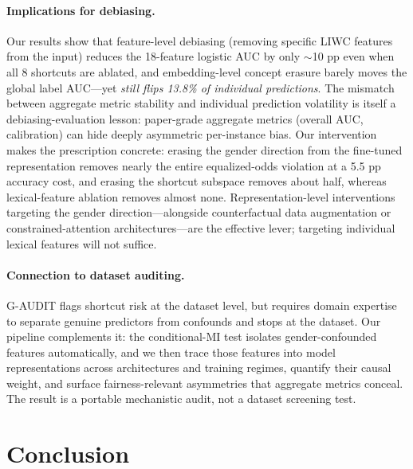 \documentclass[11pt]{article}
\begin{document}
\paragraph{Implications for debiasing.}
Our results show that feature-level debiasing (removing specific LIWC features from the input) reduces the 18-feature logistic AUC by only $\sim$10 pp even when all 8 shortcuts are ablated, and embedding-level concept erasure barely moves the global label AUC---yet \emph{still flips 13.8\% of individual predictions}. The mismatch between aggregate metric stability and individual prediction volatility is itself a debiasing-evaluation lesson: paper-grade aggregate metrics (overall AUC, calibration) can hide deeply asymmetric per-instance bias. Our intervention makes the prescription concrete: erasing the gender direction from the fine-tuned representation removes nearly the entire equalized-odds violation at a 5.5 pp accuracy cost, and erasing the shortcut subspace removes about half, whereas lexical-feature ablation removes almost none. Representation-level interventions targeting the gender direction---alongside counterfactual data augmentation or constrained-attention architectures---are the effective lever; targeting individual lexical features will not suffice.

\paragraph{Connection to dataset auditing.}
G-AUDIT \citep{drenkow2025gaudit} flags shortcut risk at the dataset level, but requires domain expertise to separate genuine predictors from confounds and stops at the dataset. Our pipeline complements it: the conditional-MI test isolates gender-confounded features automatically, and we then trace those features into model representations across architectures and training regimes, quantify their causal weight, and surface fairness-relevant asymmetries that aggregate metrics conceal. The result is a portable mechanistic audit, not a dataset screening test.

\section{Conclusion}
\end{document}
